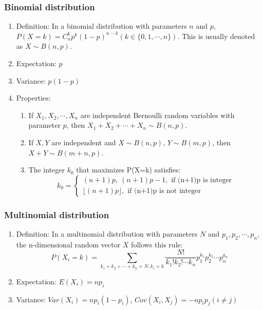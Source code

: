 \documentclass[a4paper]{article}
\begin{document}
	\subsubsection{Binomial distribution}
		\begin{enumerate}
		\item Definition: In a binomial distribution with parameters $n$ and $p$, $P(X=k)=C^k_{n}p^k(1-p)^{n-k} (k\in\{0,1,\cdots,n\})$. This is usually denoted as $X\sim B(n,p)$.
		\item Expectation: $p$
		\item Variance: $p(1-p)$
		\item Properties:
			\begin{enumerate}
			\item If $X_1,X_2,\cdots,X_n$ are independent Bernoulli random variables with parameter $p$, then $X_1+X_2+\cdots+X_n\sim B(n,p)$.
			\item If $X,Y$ are independent and $X\sim B(n,p)$, $Y\sim B(m,p)$, then\\ $X+Y\sim B(m+n,p)$.
			\item The integer $k_0$ that maximizes P(X=k) satisfies:
\begin{equation*}
	k_0=
	\begin{cases}
		(n+1)p,\ (n+1)p-1, \text{\ if (n+1)p is integer}\\
		\lfloor (n+1)p\rfloor, \text{\ if (n+1)p is not integer}
	\end{cases}
\end{equation*}
			\end{enumerate}
		\end{enumerate}


	\subsubsection{Multinomial distribution}
		\begin{enumerate}
		\item Definition: In a multinomial distribution with parameters $N$ and $p_1, p_2, \cdots, p_n$, the n-dimensional random vector $X$ follows this rule: 
	$$P(X_i=k)=\sum_{k_1+k_2+\cdots+k_n=N, k_i=k}\frac{N!}{k_1!k_2!\cdots k_n}p_1^{k_1}p_2^{k_2}\cdots p_n^{k_n}$$
		\item Expectation: $E(X_i)=np_i$
		\item Variance: $Var(X_i)=np_i(1-p_i)$, $Cov(X_i,X_j)=-np_ip_j(i\neq j)$
		\end{enumerate}
\end{document}
